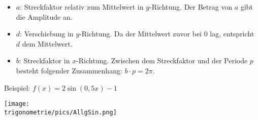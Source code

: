 \iftoggle{qrcode}{\setlength{\qrheight}{2.5cm}}{\setlength{\qrheight}{0cm}}%
\newlength{\trigoAllg}%
\setlength{\trigoAllg}{\linewidth-\qrheight}%
\begin{minipage}{\linewidth}
    \iftoggle{qrcode}{\adjustbox{valign=t, padding =0ex 0ex 0ex 0ex}{\begin{minipage}{\qrheight}%
                \href{https://www.geogebra.org/m/kuhfc6gm}{\texttt{[image: \\trigonometrie/pics/AllgSinCosQR.png]}}%
    \end{minipage}}}{}%
\end{minipage}%

\iftoggle{qrcode}{}{\bigskip}%

\begin{itemize}
	\item \(a\): \textcolor{loes}{Streckfaktor relativ zum Mittelwert in \(y\)-Richtung. Der Betrag von \(a\) gibt die Amplitude an.}

    \bigskip

	\item \(d\): \textcolor{loes}{Verschiebung in \(y\)-Richtung. Da der Mittelwert zuvor bei \(0\) lag, entspricht \(d\) dem Mittelwert.}

    \bigskip

	\item \(b\): \textcolor{loes}{Streckfaktor in \(x\)-Richtung. Zwischen dem Streckfaktor und der Periode \(p\) besteht folgender Zusammenhang: \(b\cdot p=2\pi\).}

    \bigskip

\end{itemize}

\bigskip

Beispiel: \(\displaystyle f(x)=2\sin\left(0,5x\right)-1\)

\medskip

\begin{minipage}{\textwidth}
	\texttt{[image: \\trigonometrie/pics/AllgSin.png]}
\end{minipage}

